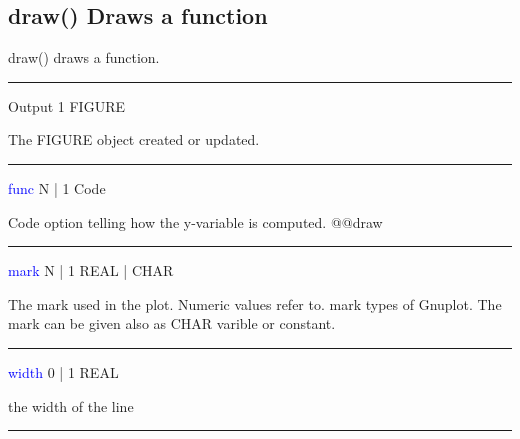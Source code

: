 \subsection{\textcolor{VioletRed}{draw}() Draws a function}
\label{draw}
\textcolor{VioletRed}{draw}() draws a function.
\vspace{0.3cm}
\hrule
\vspace{0.3cm}
\noindent Output  \tabto{3cm}  1 \tabto{5cm}   FIGURE  \tabto{7cm}
\begin{changemargin}{3cm}{0cm}
\noindent  The FIGURE object created or updated.
\end{changemargin}
\vspace{0.3cm}
\hrule
\vspace{0.3cm}
\noindent \textcolor{blue}{func} \tabto{3cm}  N | 1  \tabto{5cm}   Code  \tabto{7cm}
\begin{changemargin}{3cm}{0cm}
\noindent   Code option telling how the y-variable is computed.
@@draw
\end{changemargin}
\vspace{0.3cm}
\hrule
\vspace{0.3cm}
\noindent \textcolor{blue}{mark}  \tabto{3cm}  N | 1  \tabto{5cm}   REAL | CHAR  \tabto{7cm}
\begin{changemargin}{3cm}{0cm}
\noindent  The mark used in the plot.
Numeric values refer to.
mark types of Gnuplot. The mark can be given also as CHAR varible or constant.
\end{changemargin}
\vspace{0.3cm}
\hrule
\vspace{0.3cm}
\noindent \textcolor{blue}{width}  \tabto{3cm}  0 | 1  \tabto{5cm}   REAL  \tabto{7cm}
\begin{changemargin}{3cm}{0cm}
\noindent  the width of the line
\end {changemargin}
\hrule
\vspace{0.2cm}
